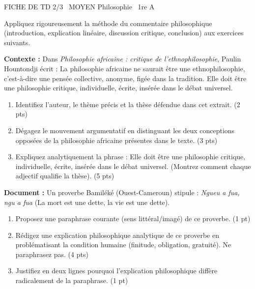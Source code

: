 \documentclass[11pt]{article}
\begin{document}
\begin{tcolorbox}[enhanced,colback=popink,colframe=popink,arc=10pt,boxrule=0pt,left=12pt,right=12pt,top=9pt,bottom=9pt]
{\color{white}\popxbold\small FICHE DE TD 2/3 \textbullet\ MOYEN \hfill Philosophie \textbullet\ 1re A\par}
\end{tcolorbox}
\vspace{4pt}
\noindent Appliquez rigoureusement la méthode du commentaire philosophique (introduction, explication linéaire, discussion critique, conclusion) aux exercices suivants.

\begin{exercice}
\textbf{Contexte :} Dans \textit{Philosophie africaine : critique de l'ethnophilosophie}, Paulin Hountondji écrit : \og La philosophie africaine ne saurait être une ethnophilosophie, c'est-à-dire une pensée collective, anonyme, figée dans la tradition. Elle doit être une philosophie critique, individuelle, écrite, insérée dans le débat universel. \fg{} 
\begin{enumerate}
    \item Identifiez l'auteur, le thème précis et la thèse défendue dans cet extrait. (2 pts)
    \item Dégagez le mouvement argumentatif en distinguant les deux conceptions opposées de la philosophie africaine présentes dans le texte. (3 pts)
    \item Expliquez analytiquement la phrase : \og Elle doit être une philosophie critique, individuelle, écrite, insérée dans le débat universel. \fg{} (Montrez comment chaque adjectif qualifie la thèse). (5 pts)
\end{enumerate}
\end{exercice}

\begin{exercice}
\textbf{Document :} Un proverbe Bamiléké (Ouest-Cameroun) stipule : \og \textit{Ngueu a fua, ngu a fua} \fg{} (La mort est une dette, la vie est une dette).
\begin{enumerate}
    \item Proposez une paraphrase courante (sens littéral/imagé) de ce proverbe. (1 pt)
    \item Rédigez une explication philosophique analytique de ce proverbe en problématisant la condition humaine (finitude, obligation, gratuité). Ne paraphrasez pas. (4 pts)
    \item Justifiez en deux lignes pourquoi l'explication philosophique diffère radicalement de la paraphrase. (1 pt)
\end{enumerate}
\end{exercice}
\end{document}
